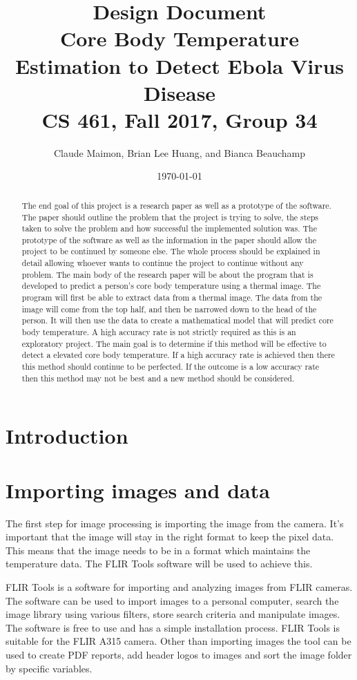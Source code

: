 \documentclass[onecolumn, draftclsnofoot,10pt, compsoc]{IEEEtran}
\title{%
  Design Document \\
  \vspace{0.4cm}
  \large Core Body Temperature Estimation to Detect Ebola Virus Disease \\
  \vspace{0.4cm}
  \large CS 461, Fall 2017, Group 34\\
    }
\author{Claude Maimon, Brian Lee Huang, and Bianca Beauchamp}
\date{\today}
\begin{document}
\maketitle

\begin{abstract}
	The end goal of this project is a research paper as well as a prototype of the software. The paper should outline the problem that the project is trying to solve, the steps taken to solve the problem and how successful the implemented solution was. The prototype of the software as well as the information in the paper should allow the project to be continued by someone else. The whole process should be explained in detail allowing whoever wants to continue the project to continue without any problem. The main body of the research paper will be about the program that is developed to predict a person's core body temperature using a thermal image. The program will first be able to extract data from a thermal image. The data from the image will come from the top half, and then be narrowed down to the head of the person. It will then use the data to create a mathematical model that will predict core body temperature. A high accuracy rate is not strictly required as this is an exploratory project. The main goal is to determine if this method will be effective to detect a elevated core body temperature. If a high accuracy rate is achieved then there this method should continue to be perfected. If the outcome is a low accuracy rate then this method may not be best and a new method should be considered.
\end{abstract}

\newpage

\tableofcontents
\newpage
\section{Introduction}

\section{Importing images and data}

The first step for image processing is importing the image from the camera. It’s important that the image will stay in the right format to keep the pixel data. This means that the image needs to be in a format which maintains the temperature data. The FLIR Tools software will be used to achieve this. 

FLIR Tools is a software for importing and analyzing images from FLIR cameras. The software can be used to import images to a personal computer, search the image library using various filters, store search criteria and manipulate images. The software is free to use and has a simple installation process. FLIR Tools is suitable for the FLIR A315 camera. Other than importing images the tool can be used to create PDF reports, add header logos to images and sort the image folder by specific variables.\cite{ClaudeTech}
\end{document}
